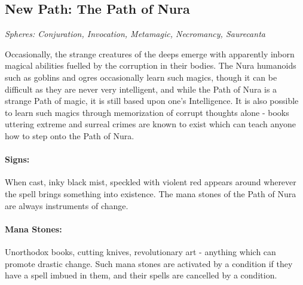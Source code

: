 \begin{multicols}{2}

\subsection{New Path: The Path of Nura}

\textit{Spheres: Conjuration, Invocation, Metamagic, Necromancy, Saurecanta}

\noindent Occasionally, the strange creatures of the deeps emerge with apparently inborn magical abilities fuelled by the corruption in their bodies.  The Nura humanoids such as goblins and ogres occasionally learn such magics, though it can be difficult as they are never very intelligent, and while the Path of Nura is a strange Path of magic, it is still based upon one's Intelligence.  It is also possible to learn such magics through memorization of corrupt thoughts alone - books uttering extreme and surreal crimes are known to exist which can teach anyone how to step onto the Path of Nura.

\paragraph{Signs:} When cast, inky black mist, speckled with violent red appears around wherever the spell brings something into existence.  The mana stones of the Path of Nura are always instruments of change.

\paragraph{Mana Stones:} Unorthodox books, cutting knives, revolutionary art - anything which can promote drastic change.  Such mana stones are activated by a condition if they have a spell imbued in them, and their spells are cancelled by a condition.

\end{multicols}



